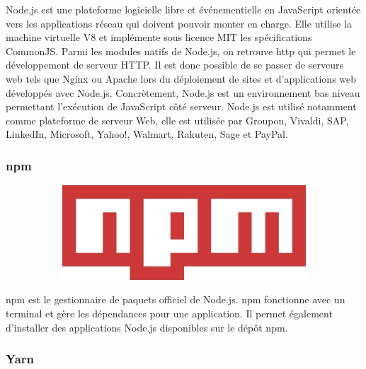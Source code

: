 \documentclass{article}
\begin{document}
Node.js est une plateforme logicielle libre et événementielle en JavaScript orientée vers les applications réseau qui doivent pouvoir monter en charge. 
Elle utilise la machine virtuelle V8 et implémente sous licence MIT les spécifications CommonJS.
Parmi les modules natifs de Node.js, on retrouve http qui permet le développement de serveur HTTP. Il est donc possible de se passer de serveurs web tels que Nginx ou Apache lors du déploiement de sites et d'applications web développés avec Node.js.
Concrètement, Node.js est un environnement bas niveau permettant l’exécution de JavaScript côté serveur.
Node.js est utilisé notamment comme plateforme de serveur Web, elle est utilisée par Groupon, Vivaldi, SAP, LinkedIn, Microsoft, Yahoo!, Walmart, Rakuten, Sage et PayPal.


\subsubsection{npm}

\begin{figure}[h!]
	\centering
  	\begin{subfigure}[b]{0.2\linewidth}
    \includegraphics[width=\linewidth]{npm.png}
  	\end{subfigure}
\end{figure}

npm est le gestionnaire de paquets officiel de Node.js. npm fonctionne avec un terminal et gère les dépendances pour une application. Il permet également d'installer des applications Node.js disponibles sur le dépôt npm. 
\newpage
\subsubsection{Yarn}
\end{document}
